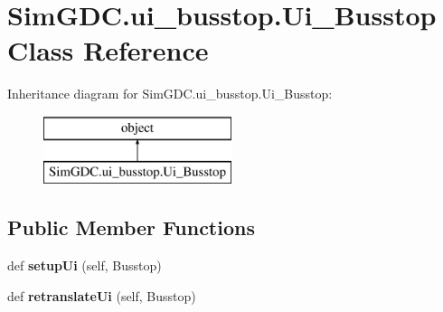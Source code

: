 \hypertarget{class_sim_g_d_c_1_1ui__busstop_1_1_ui___busstop}{}\section{Sim\+G\+D\+C.\+ui\+\_\+busstop.\+Ui\+\_\+\+Busstop Class Reference}
\label{class_sim_g_d_c_1_1ui__busstop_1_1_ui___busstop}
Inheritance diagram for Sim\+G\+D\+C.\+ui\+\_\+busstop.\+Ui\+\_\+\+Busstop\+:\begin{figure}[H]
\begin{center}
\leavevmode
\includegraphics[height=2.000000cm]{class_sim_g_d_c_1_1ui__busstop_1_1_ui___busstop}
\end{center}
\end{figure}
\subsection*{Public Member Functions}
\begin{DoxyCompactItemize}
\item 
\hypertarget{class_sim_g_d_c_1_1ui__busstop_1_1_ui___busstop_a495a602fa4551985777656dd495d6498}{}def {\bfseries setup\+Ui} (self, Busstop)\label{class_sim_g_d_c_1_1ui__busstop_1_1_ui___busstop_a495a602fa4551985777656dd495d6498}

\item 
\hypertarget{class_sim_g_d_c_1_1ui__busstop_1_1_ui___busstop_ace330819588006f630f266b90ae270b5}{}def {\bfseries retranslate\+Ui} (self, Busstop)\label{class_sim_g_d_c_1_1ui__busstop_1_1_ui___busstop_ace330819588006f630f266b90ae270b5}

\end{DoxyCompactItemize}
